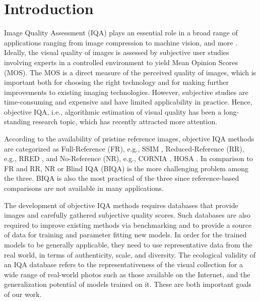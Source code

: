 \documentclass[10pt,journal,compsoc]{IEEEtran}
\begin{document}
\IEEEpeerreviewmaketitle

\section{Introduction}
Image Quality Assessment (IQA) plays an essential role in a broad range of applications ranging from image compression to machine vision, and more \cite{wang2011applications,Kopilovic_2005_Sziranyi, dodge2016understanding,men2019visual}. 
Ideally, the visual quality of images is assessed by subjective user studies involving experts in a controlled environment to yield Mean Opinion Scores (MOS). The MOS is a direct measure of the perceived quality of images, which is important both for choosing the right technology and for making further improvements to existing imaging technologies. However, subjective studies are time-consuming and expensive and have limited applicability in practice. Hence, objective IQA,  i.e., algorithmic estimation of visual quality has been a long-standing research topic, which has recently attracted more attention.

According to the availability of pristine reference images, objective IQA methods are categorized as Full-Reference (FR), e.g., SSIM \cite{wang2004image}, Reduced-Reference (RR), e.g., RRED \cite{Soundararajan:2012}, and No-Reference (NR), e.g., CORNIA \cite{ye2012unsupervised},  HOSA \cite{hosa}. In comparison to FR and RR, NR or Blind IQA (BIQA) is the more challenging problem among the three. BIQA is also the most practical of the three since reference-based comparisons are not available in many applications.

The development of objective IQA methods requires data\-bases that provide images and carefully gathered subjective quality scores. Such databases are also required to improve existing methods via benchmarking and to provide a source of data for training and parameter fitting new models. In order for the trained models to be generally applicable, they need to use representative data from the real world, in terms of authenticity, scale, and diversity. The ecological validity of an IQA database refers to the representativeness of the visual collection for a wide range of real-world photos such as those available on the Internet, and the generalization potential of models trained on it. These are both important goals of our work.
\end{document}
